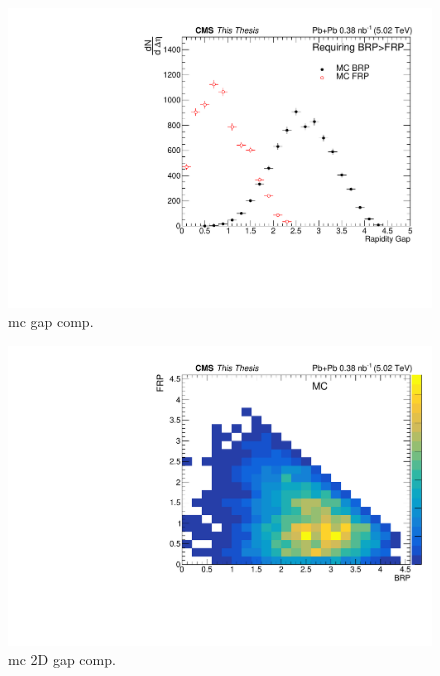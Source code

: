 \begin{figure}[h!]
\begin{centering}
\includegraphics[width=5in]{Chapter6/importfigs/mcGapComp_thesis.pdf}
\par\end{centering}
\caption{mc gap comp. \label{fig:mcGapComp}}
\end{figure}

\begin{figure}[h!]
\begin{centering}
\includegraphics[width=5in]{Chapter6/importfigs/mc2DGap_thesis.pdf}
\par\end{centering}
\caption{mc 2D gap comp. \label{fig:mc2DGap}}
\end{figure}

